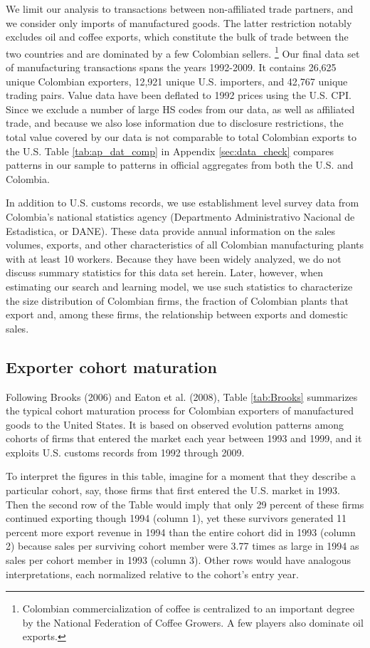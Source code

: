 \documentclass[12pt]{article}
\begin{document}
We limit our analysis to transactions between non-affiliated trade partners,
and we consider only imports of manufactured goods. The latter restriction
notably excludes oil and coffee exports, which constitute the bulk of trade
between the two countries and are dominated by a few Colombian sellers.%
\footnote{%
Colombian commercialization of coffee is centralized to an important degree
by the National Federation of Coffee Growers. A few players also dominate
oil exports.} Our final data set of manufacturing transactions spans the
years 1992-2009. It contains 26,625 unique Colombian exporters, 12,921
unique U.S. importers, and 42,767 unique trading pairs. Value data have been
deflated to 1992 prices using the U.S. CPI. Since we exclude a number of
large HS codes from our data, as well as affiliated trade, and because we
also lose information due to disclosure restrictions, the total value
covered by our data is not comparable to total Colombian exports to the U.S.
Table \ref{tab:ap_dat_comp} in Appendix \ref{sec:data_check} compares
patterns in our sample to patterns in official aggregates from both the U.S.
and Colombia.

In addition to U.S. customs records, we use establishment level survey data
from Colombia's national statistics agency (Departmento Administrativo
Nacional de Estadistica, or DANE). These data provide annual information on
the sales volumes, exports, and other characteristics of all Colombian
manufacturing plants with at least 10 workers. Because they have been widely
analyzed, we do not discuss summary statistics for this data set herein.
Later, however, when estimating our search and learning model, we use such
statistics to characterize the size distribution of Colombian firms, the
fraction of Colombian plants that export and, among these firms, the
relationship between exports and domestic sales.

\subsection{Exporter cohort maturation}

Following Brooks (2006) and Eaton et al. (2008), Table \ref{tab:Brooks}
summarizes the typical cohort maturation process for Colombian exporters of
manufactured goods to the United States. It is based on observed evolution
patterns among cohorts of firms that entered the market each year between
1993 and 1999, and it exploits U.S. customs records from 1992 through 2009.

To interpret the figures in this table, imagine for a moment that they
describe a particular cohort, say, those firms that first entered the U.S.
market in 1993. Then the second row of the Table would imply that only 29
percent of these firms continued exporting though 1994 (column 1), yet these
survivors generated 11 percent more export revenue in 1994 than the entire
cohort did in 1993 (column 2) because sales per surviving cohort member were
3.77 times as large in 1994 as sales per cohort member in 1993 (column 3).
Other rows would have analogous interpretations, each normalized relative to
the cohort's entry year.
\end{document}
